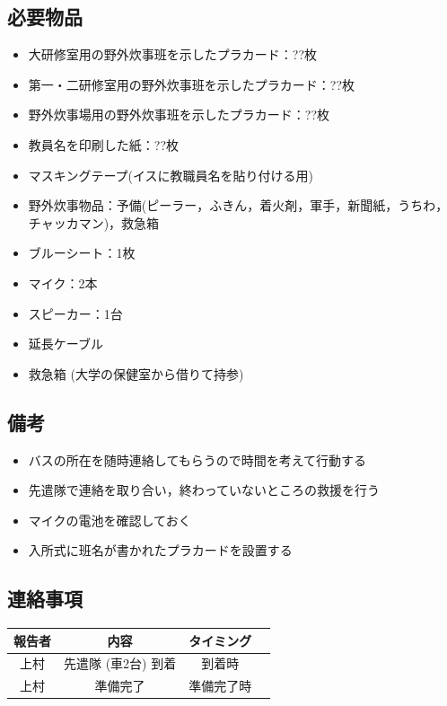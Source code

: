 \subsection{必要物品}
\begin{itemize}
\item 大研修室用の野外炊事班を示したプラカード：??枚
\item 第一・二研修室用の野外炊事班を示したプラカード：??枚
\item 野外炊事場用の野外炊事班を示したプラカード：??枚
\item 教員名を印刷した紙：??枚
\item マスキングテープ(イスに教職員名を貼り付ける用)
\item 野外炊事物品：予備(ピーラー，ふきん，着火剤，軍手，新聞紙，うちわ，チャッカマン)，救急箱
\item ブルーシート：1枚
\item マイク：2本
\item スピーカー：1台
\item 延長ケーブル
\item 救急箱 (大学の保健室から借りて持参)
\end{itemize}



\subsection{備考}
\begin{itemize}
\item バスの所在を随時連絡してもらうので時間を考えて行動する
\item 先遣隊で連絡を取り合い，終わっていないところの救援を行う
\item マイクの電池を確認しておく
\item 入所式に班名が書かれたプラカードを設置する
\end{itemize}


\subsection{連絡事項}
\begin{table}[h]
\begin{tabular}{|c|c|c|c|}
\hline
報告者 & 内容 & タイミング \\ \hline \hline
上村 & 先遣隊 (車2台) 到着 & 到着時\\ \hline
上村 & 準備完了 & 準備完了時 \\ \hline
\end{tabular}
\end{table}

%
